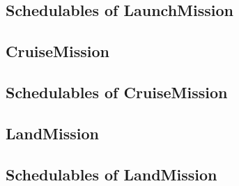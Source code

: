 \documentclass[10pt,a4paper]{article}
\begin{document}
\subsection{Schedulables of LaunchMission}


\newpage


\subsection{CruiseMission}

\newpage

\subsection{Schedulables of CruiseMission}


\newpage


\newpage


\newpage


\subsection{LandMission}

\newpage

\subsection{Schedulables of LandMission}


\newpage


\newpage


\newpage


\end{document}

